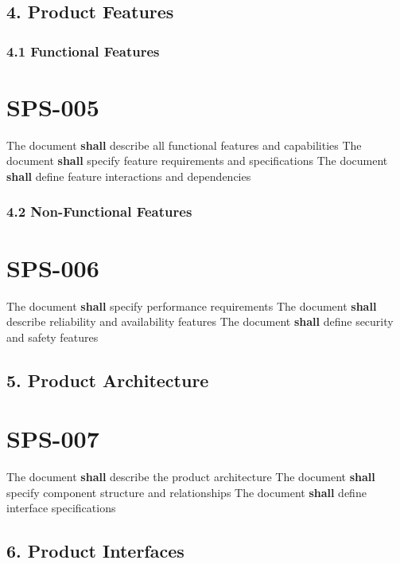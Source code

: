 \subsection{4. Product Features}

\subsubsection{4.1 Functional Features}

\section{SPS-005}\label{SPS-005}

The document \textbf{shall} describe all functional features and capabilities
The document \textbf{shall} specify feature requirements and specifications
The document \textbf{shall} define feature interactions and dependencies

\subsubsection{4.2 Non-Functional Features}

\section{SPS-006}\label{SPS-006}

The document \textbf{shall} specify performance requirements
The document \textbf{shall} describe reliability and availability features
The document \textbf{shall} define security and safety features

\subsection{5. Product Architecture}

\section{SPS-007}\label{SPS-007}

The document \textbf{shall} describe the product architecture
The document \textbf{shall} specify component structure and relationships
The document \textbf{shall} define interface specifications

\subsection{6. Product Interfaces}

